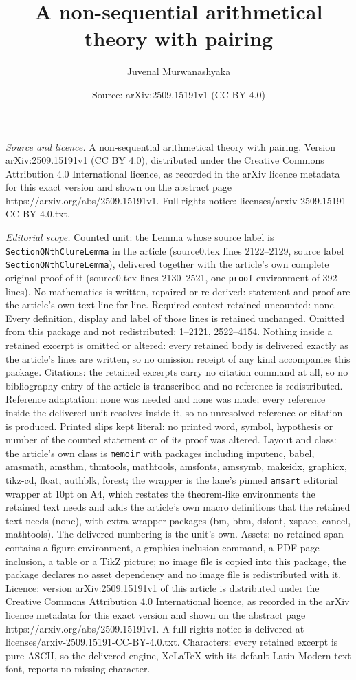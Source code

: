 \documentclass[10pt,a4paper]{amsart}
\title[A non-sequential arithmetical theory with pairing]{A non-sequential arithmetical theory with pairing}
\author{Juvenal Murwanashyaka}
\date{Source: arXiv:2509.15191v1 (CC BY 4.0)}
\begin{document}
\maketitle

\noindent\emph{Source and licence.} A non-sequential arithmetical theory with pairing. Version arXiv:2509.15191v1 (CC BY 4.0), distributed under the Creative Commons Attribution 4.0 International licence, as recorded in the arXiv licence metadata for this exact version and shown on the abstract page https://arxiv.org/abs/2509.15191v1. Full rights notice: licenses/arxiv-2509.15191-CC-BY-4.0.txt.\par\smallskip

\noindent\textit{Editorial scope.} Counted unit: the Lemma whose source label is \texttt{SectionQNthClureLemma} in the article (source0.tex lines 2122--2129, source label \texttt{SectionQNthClureLemma}), delivered together with the article's own complete original proof of it (source0.tex lines 2130--2521, one \texttt{proof} environment of 392 lines). No mathematics is written, repaired or re-derived: statement and proof are the article's own text line for line. Required context retained uncounted: none. Every definition, display and label of those lines is retained unchanged. Omitted from this package and not redistributed: 1--2121, 2522--4154. Nothing inside a retained excerpt is omitted or altered: every retained body is delivered exactly as the article's lines are written, so no omission receipt of any kind accompanies this package. Citations: the retained excerpts carry no citation command at all, so no bibliography entry of the article is transcribed and no reference is redistributed. Reference adaptation: none was needed and none was made; every reference inside the delivered unit resolves inside it, so no unresolved reference or citation is produced. Printed slips kept literal: no printed word, symbol, hypothesis or number of the counted statement or of its proof was altered. Layout and class: the article's own class is \texttt{memoir} with packages including inputenc, babel, amsmath, amsthm, thmtools, mathtools, amsfonts, amssymb, makeidx, graphicx, tikz-cd, float, authblk, forest; the wrapper is the lane's pinned \texttt{amsart} editorial wrapper at 10pt on A4, which restates the theorem-like environments the retained text needs and adds the article's own macro definitions that the retained text needs (none), with extra wrapper packages (bm, bbm, dsfont, xspace, cancel, mathtools). The delivered numbering is the unit's own. Assets: no retained span contains a figure environment, a graphics-inclusion command, a PDF-page inclusion, a table or a TikZ picture; no image file is copied into this package, the package declares no asset dependency and no image file is redistributed with it. Licence: version arXiv:2509.15191v1 of this article is distributed under the Creative Commons Attribution 4.0 International licence, as recorded in the arXiv licence metadata for this exact version and shown on the abstract page https://arxiv.org/abs/2509.15191v1. A full rights notice is delivered at licenses/arxiv-2509.15191-CC-BY-4.0.txt. Characters: every retained excerpt is pure ASCII, so the delivered engine, XeLaTeX with its default Latin Modern text font, reports no missing character.
\end{document}
